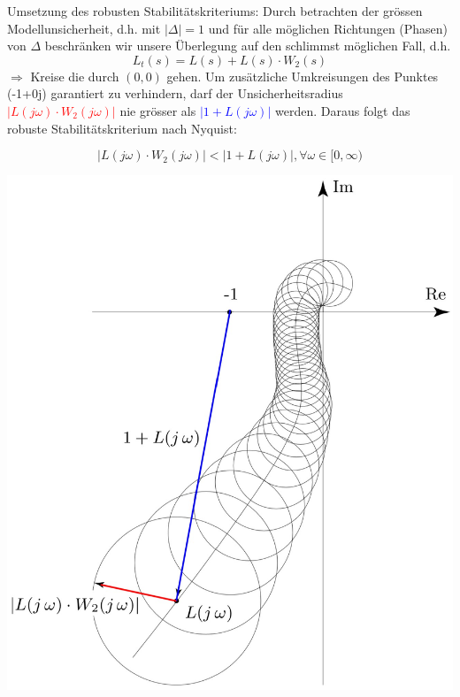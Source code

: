             Umsetzung des robusten Stabilitätskriteriums: Durch betrachten der grössen Modellunsicherheit, d.h. mit $|\Delta|=1$ und für alle möglichen Richtungen (Phasen) von $\Delta$ beschränken wir unsere Überlegung auf den schlimmst möglichen Fall, d.h. 
            \[L_t(s) = L(s) + L(s)\cdot W_2(s)\]
            $\Rightarrow$ Kreise die durch $(0,0)$ gehen.
 \vfill\null\columnbreak          
            Um zusätzliche Umkreisungen des Punktes (-1+0j) garantiert zu verhindern, darf der Unsicherheitsradius \textcolor{red}{$|L(j\omega)\cdot W_2(j\omega)|$} nie grösser als \textcolor{blue}{$|1+L(j\omega)|$} werden. Daraus folgt das robuste Stabilitätskriterium nach Nyquist:
            
            \[|L(j\omega)\cdot W_2(j\omega)| < |1+L(j\omega)|,\forall\omega\in[0,\infty)\]
            
            \begin{center}
                \includegraphics[width = 0.6\linewidth]{images/07/Robustes_nyq_Stabkrit.jpg}
            \end{center}